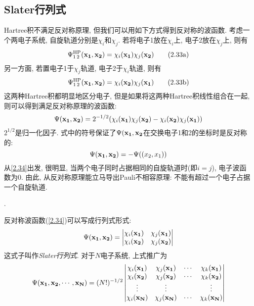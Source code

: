 \subsection{Slater行列式}
 \label{sec2.2.3}
Hartree积不满足反对称原理, 但我们可以用如下方式得到反对称的波函数. 考虑一个两电子系统, 自旋轨道分别是$\chi_i$和$\chi_j$. 若将电子1放在$\chi_i$上, 电子2放在$\chi_j$上, 则有
\begin{equation}
\begin{subequations}
\Psi^{\rm HP}_{1\,2}(\bo{x_1,x_2})=\chi_i(\bo{x_1})\chi_j(\bo{x_2})\tag{2.33a}
\end{subequations}
\end{equation}
另一方面, 若置电子1于$\chi_j$轨道, 电子2于$\chi_i$轨道, 则有
\begin{equation*}
\addtocounter{equation}{-1}
\Psi^{\rm HP}_{1\,2}(\bo{x_1,x_2})=\chi_i(\bo{x_2})\chi_j(\bo{x_1})\tag{2.33b}
\end{equation*}
这两种Hartree积都明显地区分电子, 但是如果将这两种Hartree积线性组合在一起, 则可以得到满足反对称原理的波函数:
\begin{equation}
\label{2.34}
\Psi(\mathbf{x_1,x_2})=2^{-1/2}(\chi_i(\mathbf{x_1})\chi_j(\mathbf{x_2})-\chi_i(\mathbf{x_2})\chi_j(\mathbf{x_1}))
\end{equation}
$2^{1/2}$是归一化因子. 式中的符号保证了$\Psi(\mathbf{x_1,x_2}$在交换电子1和2的坐标时是反对称的:
\begin{equation}
\Psi(\mathbf{x_1,x_2})=-\Psi(\mathbf{(}x_2,x_1))
\end{equation}
从\ref{2.34}出发, 很明显, 当两个电子同时占据相同的自旋轨道时(即$i=j$), 电子波函数为0. 由此, 从反对称原理能立马导出Pauli不相容原理: 不能有超过一个电子占据一个自旋轨道.

.

反对称波函数(\ref{2.34})可以写成行列式形式:
\begin{equation}
\Psi(\mathbf{x_1,x_2})=
\begin{vmatrix}
\chi_i(\mathbf{x_1})&\chi_j(\mathbf{x_1})\\
\chi_i(\mathbf{x_2})&\chi_j(\mathbf{x_2})
\end{vmatrix}
\end{equation}
这式子叫作\emph{Slater行列式}. 对于$N$电子系统, 上式推广为
\begin{equation}
\Psi(\mathbf{x_1,x_2,\cdots,x_N})=(N!)^{-1/2}
\begin{vmatrix}
\chi_i(\mathbf{x_1})&\chi_j(\mathbf{x_1})&\cdots&\chi_k(\mathbf{x_1})\\
\chi_i(\mathbf{x_2})&\chi_j(\mathbf{x_2})&\cdots&\chi_k(\mathbf{x_2})\\
\vdots			&\vdots			& \,&\vdots\\
\chi_i(\mathbf{x_N})&\chi_j(\mathbf{x_N})&\cdots&\chi_k(\mathbf{x_N})
\end{vmatrix}
\end{equation}

